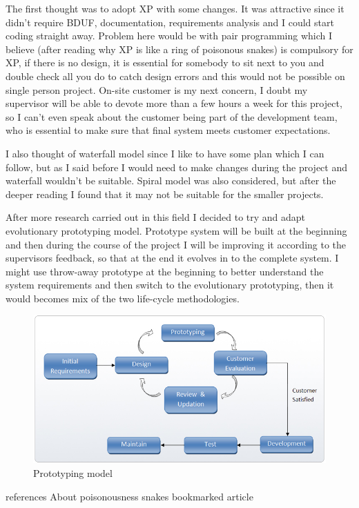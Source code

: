 \documentclass[]{report}
\begin{document}
The first thought was to adopt XP with some changes. It was attractive since it didn't require BDUF, documentation, requirements analysis and I could start coding straight away. Problem here would be with pair programming which I believe (after reading why XP is like a ring of poisonous snakes) is compulsory for XP, if there is no design, it is essential for somebody to sit next to you and double check all you do to catch design errors and this would not be possible on single person project. On-site customer is my next concern, I doubt my supervisor will be able to devote more than a few hours a week for this project, so I can't even speak about the customer being part of the development team, who is essential to make sure that final system meets customer expectations.

I also thought of waterfall model since I like to have some plan which I can follow, but as I said before I would need to make changes during the project and waterfall wouldn't be suitable. Spiral model was also considered, but after the deeper reading I found that it may not be suitable for the smaller projects.

After more research carried out in this field I decided to try and adapt evolutionary prototyping model. Prototype system will be built at the beginning and then during the course of the project I will be improving it according to the supervisors feedback, so that at the end it evolves in to the complete system. I might use throw-away prototype at the beginning to better understand the system requirements and then switch to the evolutionary prototyping, then it would becomes mix of the two life-cycle methodologies.

\begin{figure}[H]
\centering
\centerline{\includegraphics[scale=0.55]{./prototype_methodology}}
\caption{Prototyping model }
\label{fig:i-s-hierarchy-tree-march-2012}
\end{figure}


 
 references
 About poisonousness snakes
 bookmarked article
 
\end{document}
